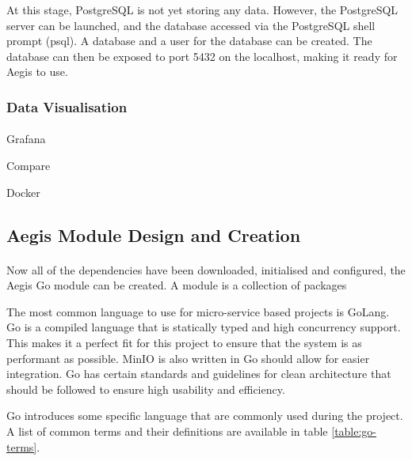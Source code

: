 \documentclass[12pt, conference, final, a4paper, onecolumn, compsoc]{IEEEtran}
\begin{document}

At this stage, PostgreSQL is not yet storing any data. However, the PostgreSQL
server can be launched, and the database accessed via the PostgreSQL shell
prompt (psql). A database and a user for the database can be created. The
database can then be exposed to port 5432 on the localhost, making it ready for
Aegis to use.


\subsubsection*{Data Visualisation}
\paragraph{}


Grafana


Compare

Docker



\subsection*{Aegis Module Design and Creation}
\paragraph{}

Now all of the dependencies have been downloaded, initialised and configured,
the Aegis Go module can be created. A module is a collection of packages

The most common language to use for micro-service based projects is GoLang. Go
is a compiled language that is statically typed and high concurrency support.
This makes it a perfect fit for this project to ensure that the system is as
performant as possible. MinIO is also written in Go should allow for easier
integration. Go has certain standards and guidelines for clean architecture that
should be followed to ensure high usability and efficiency.

Go introduces some specific language that are commonly used during the project.
A list of common terms and their definitions are available in table
\ref{table:go-terms}.
\end{document}
